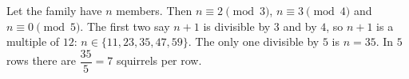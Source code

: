 Let the family have $n$ members. Then $n\equiv2\pmod3$, $n\equiv3\pmod4$ and $n\equiv0\pmod5$. The first two say $n+1$ is divisible by $3$ and by $4$, so $n+1$ is a multiple of $12$: $n\in\{11,23,35,47,59\}$. The only one divisible by $5$ is $n=35$. In $5$ rows there are $\dfrac{35}{5}=\boxed{7}$ squirrels per row.

